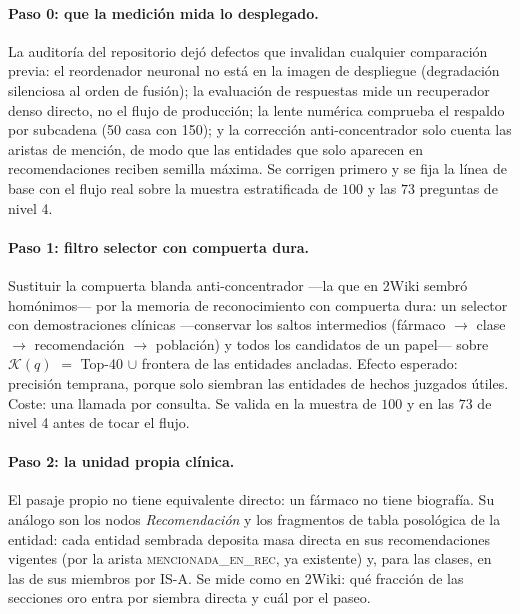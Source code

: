 \documentclass[11pt,a4paper]{article}
\begin{document}
\paragraph{Paso 0: que la medición mida lo desplegado.}
La auditoría del repositorio dejó defectos que invalidan cualquier
comparación previa: el reordenador neuronal no está en la imagen de
despliegue (degradación silenciosa al orden de fusión); la evaluación de
respuestas mide un recuperador denso directo, no el flujo de producción;
la lente numérica comprueba el respaldo por subcadena (\guillemotleft{}50\guillemotright{} casa con
\guillemotleft{}150\guillemotright{}); y la corrección anti-concentrador solo cuenta las aristas de
mención, de modo que las entidades que solo aparecen en recomendaciones
reciben semilla máxima. Se corrigen primero y se fija la línea de base
con el flujo real sobre la muestra estratificada de $100$ y las $73$
preguntas de nivel 4.

\paragraph{Paso 1: filtro selector con compuerta dura.}
Sustituir la compuerta blanda anti-concentrador ---la que en 2Wiki
sembró homónimos--- por la memoria de reconocimiento con compuerta dura:
un selector con demostraciones clínicas ---conservar los saltos
intermedios (fármaco $\to$ clase $\to$ recomendación $\to$ población) y
todos los candidatos de un papel--- sobre $\mathcal{K}(q)$ $=$ Top-40
$\cup$ frontera de las entidades ancladas. Efecto esperado: precisión
temprana, porque solo siembran las entidades de hechos juzgados útiles.
Coste: una llamada por consulta. Se valida en la muestra de $100$ y en
las $73$ de nivel 4 antes de tocar el flujo.

\paragraph{Paso 2: la unidad propia clínica.}
El pasaje propio no tiene equivalente directo: un fármaco no tiene
\guillemotleft{}biografía\guillemotright{}. Su análogo son los nodos \emph{Recomendación} y los
fragmentos de tabla posológica de la entidad: cada entidad sembrada
deposita masa directa en sus recomendaciones vigentes (por la arista
\textsc{mencionada\_en\_rec}, ya existente) y, para las clases, en las de
sus miembros por IS-A. Se mide como en 2Wiki: qué fracción de las
secciones oro entra por siembra directa y cuál por el paseo.
\end{document}
